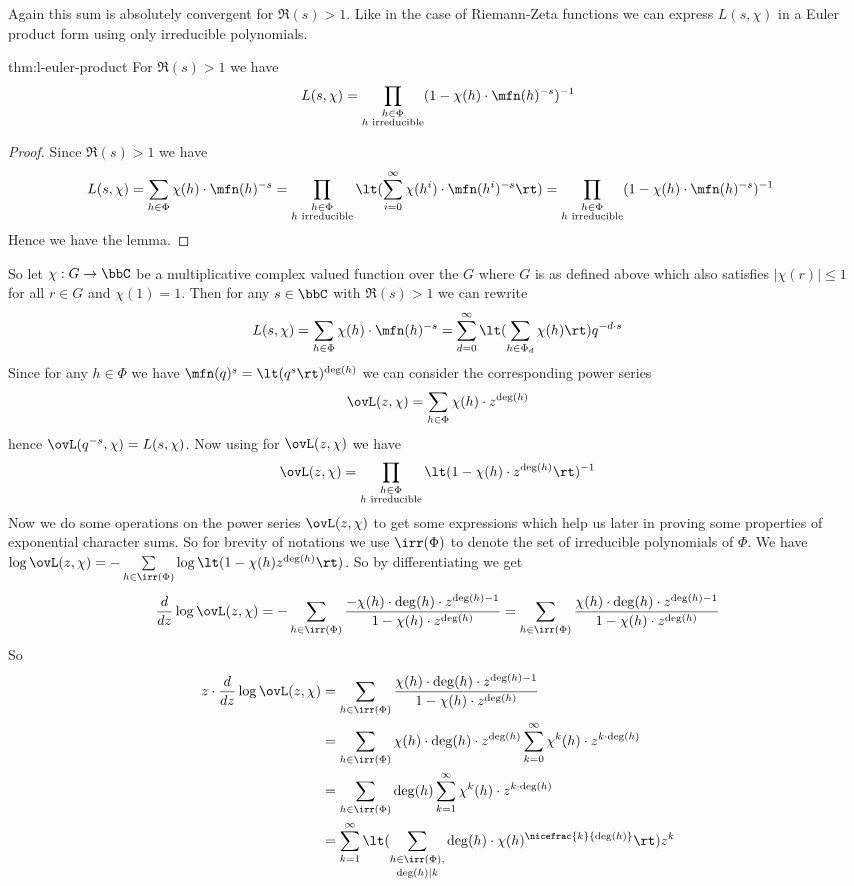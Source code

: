  Again this sum is absolutely convergent for $\Re(s)>1$. Like in the case of Riemann-Zeta functions we can express $L(s,\chi)$ in a Euler product form using only irreducible polynomials.
\begin{Theorem}{}{thm:l-euler-product}
  For $\Re(s)>1$ we have $$L(s,\chi)=\prod_{\substack{h\in\Phi\\ h\text{ irreducible}}}(1-\chi(h)\cdot \mfn(h)^{-s})^{-1}$$
\end{Theorem}
\begin{proof}
  Since $\Re(s)>1$ we have \begin{align*}
    L(s,\chi) & = \sum_{h\in\Phi}\chi(h)\cdot \mfn(h)^{-s} = \prod_{\substack{h\in\Phi\\ h\text{ irreducible}}} \lt(\sum_{i=0}^{\infty} \chi(h^i)\cdot \mfn(h^i)^{-s} \rt) = \prod_{\substack{h\in\Phi\\ h\text{ irreducible}}}(1-\chi(h)\cdot \mfn(h)^{-s})^{-1}
  \end{align*}Hence we have the lemma.
\end{proof}
So let $\chi:G\to\bbC$ be a multiplicative complex valued function over the $G$ where $G$ is as defined above which also satisfies $|\chi(r)|\leq 1$ for all $r\in G$ and $\chi(1)=1$. Then for any $s\in\bbC$ with $\Re(s)>1$ we can rewrite $$L(s,\chi)=\sum_{h\in\Phi}\chi(h)\cdot \mfn(h)^{-s}=\sum_{d=0}^{\infty}\lt(\sum_{h\in\Phi_d}\chi(h)\rt)q^{-d\cdot s}$$
Since for any $h\in\Phi$ we have $\mfn(q)^s=\lt(q^s\rt)^{\deg(h)}$ we can consider the corresponding power series $$\ovL(z,\chi)=\sum_{h\in\Phi}\chi(h)\cdot z^{\deg(h)}$$hence $\ovL(q^{-s},\chi)=L(s,\chi)$. Now using  for $\ovL(z,\chi)$ we have $$\ovL(z,\chi)=\prod_{\substack{h\in\Phi\\ h\text{ irreducible}}}\lt(1-\chi(h)\cdot z^{\deg(h)}\rt)^{-1}$$Now we do some operations on the power series $\ovL(z,\chi)$ to get some expressions which help us later in proving some properties of exponential character sums. So for brevity of notations we use $\irr(\Phi)$ to denote the set of irreducible polynomials of $\Phi$. We have $\log \ovL(z,\chi)=-\sum\limits_{h\in\irr(\Phi)}\log \lt(1-\chi(h)z^{\deg(h)}\rt)$. So by differentiating we get $$\frac{d}{dz}\log \ovL(z,\chi) =-\sum\limits_{h\in\irr(\Phi)}\frac{-\chi(h)\cdot \deg(h)\cdot z^{\deg(h)-1}}{1-\chi(h)\cdot z^{\deg(h)}}=\sum\limits_{h\in\irr(\Phi)}\frac{\chi(h)\cdot \deg(h)\cdot z^{\deg(h)-1}}{1-\chi(h)\cdot z^{\deg(h)}}$$So \begin{align}
  z\cdot \frac{d}{dz}\log \ovL(z,\chi) & = \sum\limits_{h\in\irr(\Phi)}\frac{\chi(h)\cdot \deg(h)\cdot z^{\deg(h)-1}}{1-\chi(h)\cdot z^{\deg(h)}}\notag\\
  & = \sum_{h\in\irr(\Phi)}\chi(h)\cdot \deg(h)\cdot z^{\deg(h)}\sum_{k=0}^{\infty}\chi^k(h)\cdot z^{k\cdot \deg(h)}\notag\\
  & = \sum_{h\in\irr(\Phi)}\deg(h)\sum_{k=1}^{\infty}\chi^k(h)\cdot z^{k\cdot \deg(h)}\notag\\
  & = \sum_{k=1}^{\infty}\lt(\sum_{\substack{h\in\irr(\Phi),\\[0.5mm] \deg(h)\mid k}}\deg(h)\cdot \chi(h)^{\nicefrac{k}{\deg(h)}}\rt)z^k \label{eq:l-log-deriv-irreducibles}
\end{align}
